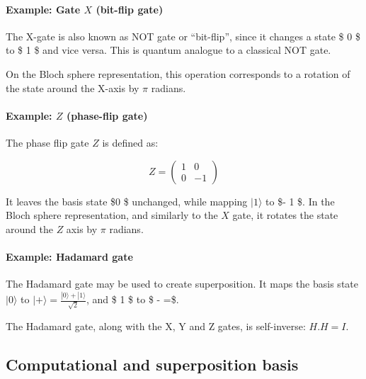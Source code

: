\documentclass[11pt]{article}
\begin{document}
    \paragraph{\texorpdfstring{Example: Gate \(X\) (bit-flip
gate)}{Example: Gate X (bit-flip gate)}}\label{example-gate-x-bit-flip-gate}

The X-gate is also known as NOT gate or ``bit-flip'', since it changes a
state \$\textbar{} 0 \rangle \$ to \$\textbar{} 1 \rangle \$ and vice
versa. This is quantum analogue to a classical NOT gate.

On the Bloch sphere representation, this operation corresponds to a
rotation of the state around the X-axis by \(\pi\) radians.

    \paragraph{\texorpdfstring{Example: \(Z\) (phase-flip
gate)}{Example: Z (phase-flip gate)}}\label{example-z-phase-flip-gate}

The phase flip gate \(Z\) is defined as:

\[
Z = 
\begin{pmatrix}
1 & 0\\
0 & -1
\end{pmatrix}
\]

It leaves the basis state \$\textbar{}0 \rangle \$ unchanged, while
mapping \(| 1 \rangle\) to \$- \textbar{} 1 \rangle \$. In the Bloch
sphere representation, and similarly to the \(X\) gate, it rotates the
state around the \(Z\) axis by \(\pi\) radians.

    \paragraph{Example: Hadamard gate}\label{example-hadamard-gate}

The Hadamard gate may be used to create superposition. It maps the basis
state \(| 0 \rangle\) to
\(| + \rangle =\frac{| 0 \rangle + | 1 \rangle }{\sqrt{2}}\), and
\$\textbar{} 1 \rangle \$ to \$ \textbar{} -
\rangle =\$.

The Hadamard gate, along with the X, Y and Z gates, is self-inverse:
\(H.H = I\).

    \subsection{Computational and superposition
basis}\label{computational-and-superposition-basis}
\end{document}
